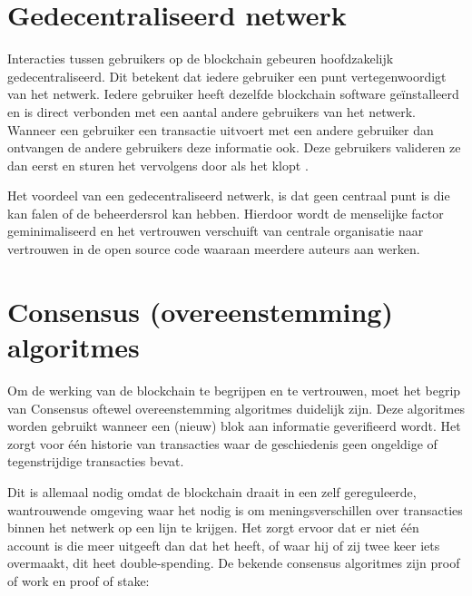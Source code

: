 \section{Gedecentraliseerd netwerk}\label{cap:decentralisedNetwork}
Interacties tussen gebruikers op de blockchain gebeuren hoofdzakelijk gedecentraliseerd. Dit betekent dat iedere gebruiker een punt vertegenwoordigt van het netwerk. Iedere gebruiker heeft dezelfde blockchain software geïnstalleerd en is direct verbonden met een aantal andere gebruikers van het netwerk. Wanneer een gebruiker een transactie uitvoert met een andere gebruiker dan ontvangen de andere gebruikers deze informatie ook. Deze gebruikers valideren ze dan eerst en sturen het vervolgens door als het klopt \cite{challengesOppertunities}.\par

Het voordeel van een gedecentraliseerd netwerk, is dat geen centraal punt is die kan falen of de beheerdersrol kan hebben. Hierdoor wordt de menselijke factor geminimaliseerd en het vertrouwen verschuift van centrale organisatie naar vertrouwen in de open source code waaraan meerdere auteurs aan werken\cite{stateNecessary}.
\newpage

\section{Consensus (overeenstemming) algoritmes}\label{cap:consensus}
Om de werking van de blockchain te begrijpen en te vertrouwen, moet het begrip van Consensus oftewel overeenstemming algoritmes  duidelijk zijn. Deze algoritmes worden gebruikt wanneer een (nieuw) blok aan informatie geverifieerd wordt. Het zorgt voor één historie van transacties waar de geschiedenis geen ongeldige of tegenstrijdige transacties bevat.\par

Dit is allemaal nodig omdat de blockchain draait in een zelf gereguleerde, wantrouwende omgeving waar het nodig is om meningsverschillen over transacties binnen het netwerk op een lijn te krijgen. Het zorgt ervoor dat er niet één account is die meer uitgeeft dan dat het heeft, of waar hij of zij twee keer iets overmaakt, dit heet double-spending. De bekende consensus algoritmes zijn proof of work en proof of stake:\par

